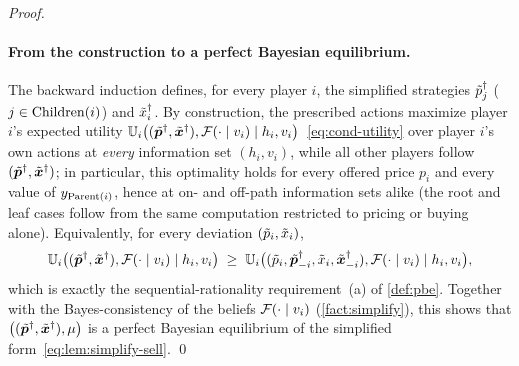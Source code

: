 \begin{proof}
\paragraph{From the construction to a perfect Bayesian equilibrium.}
The backward induction defines, for every player $i$, the simplified strategies $\tilde{p}^\dagger_j$ ($j \in \operatorname{Children}(i)$) and $\tilde{x}^\dagger_i$. By construction, the prescribed actions maximize player $i$'s expected utility $\mathbb{U}_i\big((\tilde{{\bm{p}}}^\dagger, \tilde{{\bm{x}}}^\dagger), \mathcal{F}(\cdot\mid v_i) \mid h_i, v_i\big)$~\eqref{eq:cond-utility} over player $i$'s own actions at \emph{every} information set $(h_i, v_i)$, while all other players follow $(\tilde{{\bm{p}}}^\dagger, \tilde{{\bm{x}}}^\dagger)$; in particular, this optimality holds for every offered price $p_i$ and every value of $y_{\operatorname{Parent}(i)}$, hence at on- and off-path information sets alike (the root and leaf cases follow from the same computation restricted to pricing or buying alone). Equivalently, for every deviation $(\tilde{p}_i, \tilde{x}_i)$,
\[
\mathbb{U}_i\big((\tilde{{\bm{p}}}^\dagger, \tilde{{\bm{x}}}^\dagger), \mathcal{F}(\cdot\mid v_i) \mid h_i, v_i\big) \;\ge\; \mathbb{U}_i\big((\tilde{p}_i, \tilde{{\bm{p}}}^\dagger_{-i}, \tilde{x}_i, \tilde{{\bm{x}}}^\dagger_{-i}), \mathcal{F}(\cdot\mid v_i) \mid h_i, v_i\big),
\]
which is exactly the sequential-rationality requirement~(a) of \cref{def:pbe}. Together with the Bayes-consistency of the beliefs $\mathcal{F}(\cdot \mid v_i)$ (\cref{fact:simplify}), this shows that $\big((\tilde{{\bm{p}}}^\dagger, \tilde{{\bm{x}}}^\dagger), \mu\big)$ is a perfect Bayesian equilibrium of the simplified form~\eqref{eq:lem:simplify-sell}.
\qed
\end{proof}
